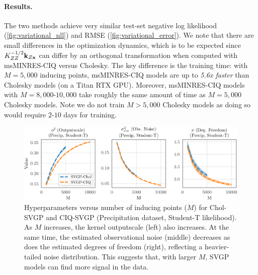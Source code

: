 \paragraph{Results.}
The two methods achieve very similar test-set negative log likelihood (\cref{fig:variational_nll}) and RMSE (\cref{fig:variational_error}).
We note that there are small
differences in the optimization dynamics, which is to be expected since $K_{ZZ}^{-1/2} \mathbf{k}_{Z\mathbf{x}}$ can differ by an orthogonal
transformation when computed with msMINRES-CIQ versus Cholesky.
The key difference is the training time:
with $M=5,\!000$ inducing points, msMINRES-CIQ models are up to \emph{5.6x faster} than Cholesky models (on a Titan RTX GPU).
Moreover, msMINRES-CIQ models with $M=8,\!000$-$10,\!000$ take roughly the same amount of time as $M=5,\!000$ Cholesky models.
Note we do not train $M > 5,\!000$ Cholesky models as doing so would require $2$-$10$ days for training.

\begin{figure}[t!]
  \centering
  \includegraphics[width=\linewidth]{figures/variational_stats.pdf}
  \caption[Train time comparison of Cholesky-whitened vs CIQ-whitened SVGP models.]{
    Hyperparameters versus number of inducing points ($M$) for Chol-SVGP and CIQ-SVGP (Precipitation dataset, Student-T likelihood).
    As $M$ increases, the kernel outputscale (left) also increases.
    At the same time, the estimated observational noise (middle) decreases as does the estimated degrees of freedom (right), reflecting a heavier-tailed noise distribution.
    This suggests that, with larger $M$, SVGP models can find more signal in the data.
  }
  \label{fig:variational_stats}
\end{figure}

